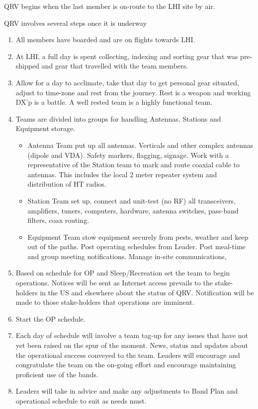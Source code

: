 \documentclass[11pt]{article}
\begin{document}
QRV begins when the last member is on-route to the LHI site by air.
\par
QRV involves several steps once it is underway
\begin{enumerate}
\item All members have boarded and are on flights towards LHI.
\item At LHI, a full day is spent collecting, indexing and sorting
gear that was pre-shipped and gear that travelled with the team members.
\item Allow for a day to acclimate, take that day to get personal gear
situated, adjust to time-zone and rest from the journey.  Rest is a weapon
and working DX'p is a battle. A well rested team is a highly functional team.
\item Teams are divided into groups for handling Antennas, Stations
and Equipment storage.
  \begin{itemize}
     \item Antenna Team put up all antennas.  Verticals and
other complex antennas (dipole and VDA).  Safety markers, flagging, signage.
     Work with a representative of the Station team to mark and route coaxial
cable to antennas.  This includes the local 2 meter repeater system and 
distribution of HT radios.
     \item Station Team set up, connect and unit-test (no RF) all
transceivers, amplifiers, tuners, computers, hardware, antenna switches,
pass-band filters, coax routing.
     \item Equipment Team stow equipment securely from pests, weather
and keep out of the paths.  Post operating schedules from Leader.  Post
meal-time and group meeting notifications. Manage in-site communications,
\end{itemize}
\item Based on schedule for OP and Sleep/Recreation set the team to
begin operations.  Notices will be sent as Internet access prevails to
the stake-holders in the US and elsewhere about the status of QRV.  Notification
will be made to those stake-holders that operations are imminent.
\item Start the OP schedule.
\item Each day of schedule will involve a team tag-up for any issues 
that have not yet been raised on the spur of the moment.  News,
status and updates about the operational success conveyed to the team.
Leaders will encourage and congratulate the team on the on-going effort
and encourage maintaining proficient use of the bands.
\item Leaders will take in advice and make any adjustments to Band Plan
and operational schedule to suit as needs must.
\end{enumerate}
\end{document}
